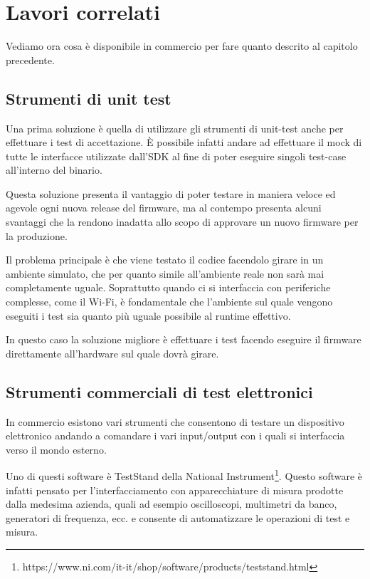 \documentclass[12pt,a4paper,twoside,titlepage]{book}
\begin{document}
\chapter{Lavori correlati}

Vediamo ora cosa è disponibile in commercio per fare quanto descrito al capitolo precedente.

\section{Strumenti di unit test}

Una prima soluzione è quella di utilizzare gli strumenti di
unit-test anche per effettuare i test di accettazione.
È possibile infatti andare ad effettuare il mock di tutte le interfacce utilizzate dall'SDK
al fine di poter eseguire singoli test-case all'interno del binario.

Questa soluzione presenta il vantaggio di poter testare in maniera veloce ed agevole
ogni nuova release del firmware, ma al contempo presenta alcuni svantaggi che la rendono
inadatta allo scopo di approvare un nuovo firmware per la produzione.

Il problema principale è che viene testato il codice facendolo girare in un ambiente simulato,
che per quanto simile all'ambiente reale non sarà mai completamente uguale. Soprattutto
quando ci si interfaccia con periferiche complesse, come il Wi-Fi, è fondamentale che
l'ambiente sul quale vengono eseguiti i test sia quanto più uguale possibile al runtime effettivo.

In questo caso la soluzione migliore è effettuare i test facendo eseguire il firmware direttamente
all'hardware sul quale dovrà girare.

\section{Strumenti commerciali di test elettronici}

In commercio esistono vari strumenti che consentono di testare un dispositivo elettronico andando
a comandare i vari input/output con i quali si interfaccia verso il mondo esterno.

Uno di questi software è TestStand della National Instrument\footnote{https://www.ni.com/it-it/shop/software/products/teststand.html}.
Questo software è infatti pensato per l'interfacciamento con apparecchiature di misura prodotte
dalla medesima azienda, quali ad esempio oscilloscopi, multimetri da banco, generatori di frequenza, ecc.
e consente di automatizzare le operazioni di test e misura.
\end{document}
